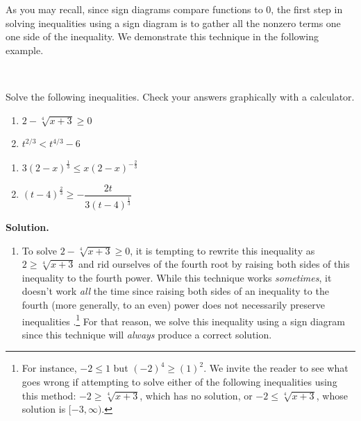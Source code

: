 \documentclass{ximera}
\begin{document}
As you may recall, since sign diagrams compare functions to $0$, the first step in solving inequalities using a sign diagram is to gather all the nonzero terms one one side of the inequality.  We demonstrate this technique in the following example.


\begin{ex} \label{powerineqex} $~$

Solve the following inequalities.  Check your answers graphically with a calculator.

\begin{multicols}{2}
\begin{enumerate}

\item $2-\sqrt[4]{x+3} \geq 0$

\item $t^{2/3} < t^{4/3} - 6$


\setcounter{HW}{\value{enumi}}

\end{enumerate}
\end{multicols}

\begin{multicols}{2}
\begin{enumerate}

\setcounter{enumi}{\value{HW}}

\item  \label{third} $3 (2-x)^{\frac{1}{3}} \leq x (2-x)^{-\frac{2}{3}}$

\item \label{fourth} $(t-4)^{\frac{2}{3}} \geq -\dfrac{2t}{3(t-4)^{\frac{1}{3}}}$  


\end{enumerate}
\end{multicols}


{\bf Solution.}  

\begin{enumerate}

\item  To solve $2-\sqrt[4]{x+3} \geq 0$, it is tempting to rewrite this inequality as $2 \geq \sqrt[4]{x+3}$ and rid ourselves of the fourth root by raising both sides of this inequality to the fourth power.  While this technique works \textit{sometimes}, it doesn't work \textit{all} the time since raising both sides of an inequality to the fourth (more generally, to an even) power does not necessarily preserve inequalities .\footnote{For instance, $-2 \leq 1$ but $(-2)^{4} \geq (1)^2$.  We invite the reader to see what goes wrong if attempting to solve either of the following inequalities using this method: $-2 \geq \sqrt[4]{x+3}$, which has no solution, or  $-2 \leq \sqrt[4]{x+3}$, whose solution is $[-3,\infty)$.}  For that reason, we solve this inequality using a sign diagram since this technique will \textit{always} produce a correct solution.    


\end{enumerate}
\end{ex}
\end{document}
